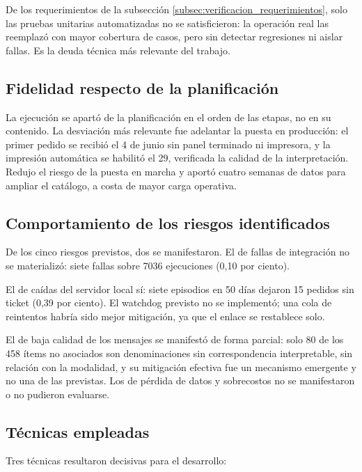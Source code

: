 De los requerimientos de la subsección \ref{subsec:verificacion_requerimientos}, solo las pruebas unitarias automatizadas no se satisficieron: la operación real las reemplazó con mayor cobertura de casos, pero sin detectar regresiones ni aislar fallas. Es la deuda técnica más relevante del trabajo.

\subsection{Fidelidad respecto de la planificación}

La ejecución se apartó de la planificación en el orden de las etapas, no en su contenido. La desviación más relevante fue adelantar la puesta en producción: el primer pedido se recibió el 4 de junio sin panel terminado ni impresora, y la impresión automática se habilitó el 29, verificada la calidad de la interpretación. Redujo el riesgo de la puesta en marcha y aportó cuatro semanas de datos para ampliar el catálogo, a costa de mayor carga operativa.

\subsection{Comportamiento de los riesgos identificados}

De los cinco riesgos previstos, dos se manifestaron. El de fallas de integración no se materializó: siete fallas sobre 7036 ejecuciones (0,10 por ciento).

El de caídas del servidor local sí: siete episodios en 50 días dejaron 15 pedidos sin ticket (0,39 por ciento). El watchdog previsto no se implementó; una cola de reintentos habría sido mejor mitigación, ya que el enlace se restablece solo.

El de baja calidad de los mensajes se manifestó de forma parcial: solo 80 de los 458 ítems no asociados son denominaciones sin correspondencia interpretable, sin relación con la modalidad, y su mitigación efectiva fue un mecanismo emergente y no una de las previstas. Los de pérdida de datos y sobrecostos no se manifestaron o no pudieron evaluarse.

\subsection{Técnicas empleadas}

Tres técnicas resultaron decisivas para el desarrollo:

